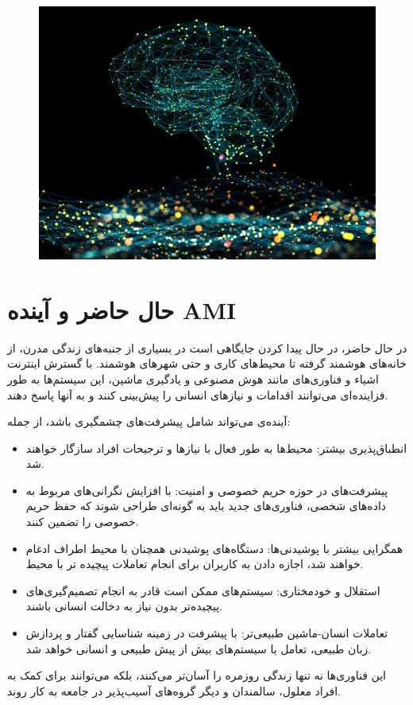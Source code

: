 \begin{figure}[H]
	\centering
	\includegraphics{pic2.jpg}
	\label{fig:label4}
\end{figure}

\section*{حال حاضر و آینده AMI}
در حال حاضر،
در حال پیدا کردن جایگاهی است در بسیاری از جنبه‌های زندگی مدرن، از خانه‌های هوشمند گرفته تا محیط‌های کاری و حتی شهرهای هوشمند. با گسترش اینترنت اشیاء 
و فناوری‌های مانند هوش مصنوعی و یادگیری ماشین، این سیستم‌ها به طور فزاینده‌ای می‌توانند اقدامات و نیازهای انسانی را پیش‌بینی کنند و به آنها پاسخ دهند.

آینده‌ی
می‌تواند شامل پیشرفت‌های چشمگیری باشد، از جمله:
\begin{itemize}
	\item انطباق‌پذیری بیشتر: محیط‌ها به طور فعال با نیازها و ترجیحات افراد سازگار خواهند شد.
	\item پیشرفت‌های در حوزه حریم خصوصی و امنیت: با افزایش نگرانی‌های مربوط به داده‌های شخصی، فناوری‌های جدید باید به گونه‌ای طراحی شوند که حفظ حریم خصوصی را تضمین کنند.
	\item همگرایی بیشتر با پوشیدنی‌ها: دستگاه‌های پوشیدنی همچنان با محیط اطراف ادغام خواهند شد، اجازه دادن به کاربران برای انجام تعاملات پیچیده تر با محیط.
	\item استقلال و خودمختاری: سیستم‌های  ممکن است قادر به انجام تصمیم‌گیری‌های پیچیده‌تر بدون نیاز به دخالت انسانی باشند.
	\item تعاملات انسان-ماشین طبیعی‌تر: با پیشرفت در زمینه شناسایی گفتار و پردازش زبان طبیعی، تعامل با سیستم‌های  بیش از پیش طبیعی و انسانی خواهد شد.
\end{itemize}
این فناوری‌ها نه تنها زندگی روزمره را آسان‌تر می‌کنند، بلکه می‌توانند برای کمک به افراد معلول، سالمندان و دیگر گروه‌های آسیب‌پذیر در جامعه به کار روند.

